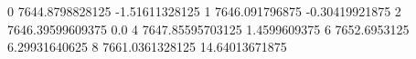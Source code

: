 0 7644.8798828125 -1.51611328125
1 7646.091796875 -0.30419921875
2 7646.39599609375 0.0
4 7647.85595703125 1.4599609375
6 7652.6953125 6.29931640625
8 7661.0361328125 14.64013671875
